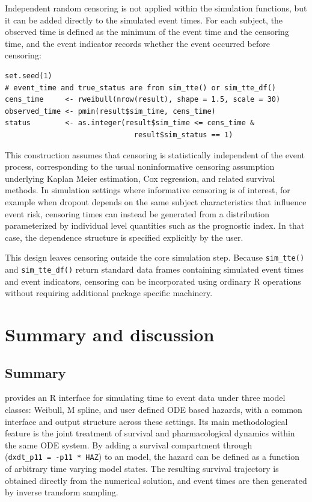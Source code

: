 Independent random censoring is not applied within the simulation functions, but it can be added directly to the simulated event times. For each subject, the observed time is defined as the minimum of the event time and the censoring time, and the event indicator records whether the event occurred before censoring:

\begin{verbatim}
set.seed(1)
# event_time and true_status are from sim_tte() or sim_tte_df()
cens_time     <- rweibull(nrow(result), shape = 1.5, scale = 30)
observed_time <- pmin(result$sim_time, cens_time)
status        <- as.integer(result$sim_time <= cens_time &
                              result$sim_status == 1)
\end{verbatim}

This construction assumes that censoring is statistically independent of the event process, corresponding to the usual noninformative censoring assumption underlying Kaplan Meier estimation, Cox regression, and related survival methods. In simulation settings where informative censoring is of interest, for example when dropout depends on the same subject characteristics that influence event risk, censoring times can instead be generated from a distribution parameterized by individual level quantities such as the prognostic index. In that case, the dependence structure is specified explicitly by the user.

This design leaves censoring outside the core simulation step. Because \texttt{sim\_tte()} and \texttt{sim\_tte\_df()} return standard data frames containing simulated event times and event indicators, censoring can be incorporated using ordinary R operations without requiring additional package specific machinery.

\section{Summary and discussion}\label{discussion}

\subsection{Summary}\label{summary}

 provides an R interface for simulating time to event data under three model classes: Weibull, M spline, and user defined ODE based hazards, with a common interface and output structure across these settings. Its main methodological feature is the joint treatment of survival and pharmacological dynamics within the same ODE system. By adding a survival compartment through (\texttt{dxdt\_p11\ =\ -p11\ *\ HAZ}) to an  model, the hazard can be defined as a function of arbitrary time varying model states. The resulting survival trajectory is obtained directly from the numerical solution, and event times are then generated by inverse transform sampling.

